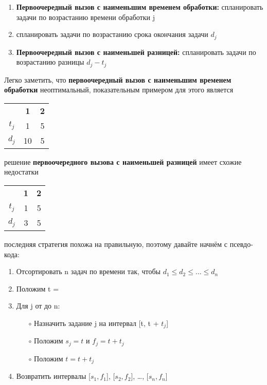\vspace{\baselineskip}
\begin{enumerate}
    \item \textbf{Первоочередный вызов с наименьшим временем обработки:} спланировать задачи по возрастанию времени обработки j
    \item \textbf{\textbf{}} спланировать задачи по возрастанию срока окончания задачи $d_j$
    \item \textbf{Первоочередный вызов с наименьшей разницей:} спланировать задачи по возрастанию разницы $d_j - t_j$
\end{enumerate}

\vspace{\baselineskip}
Легко заметить, что \textbf{первоочередный вызов с наименьшим временем обработки} неоптимальный, показательным примером для этого является

\vspace{\baselineskip}
\begin{tabular}{ccc}
\multicolumn{1}{c}{\textbf{}} &
\multicolumn{1}{c}{\textbf{1}} & \multicolumn{1}{c}{\textbf{2}} \\[5pt]
\ttfamily $t_j$ & 1 & 5\\[5pt]
\ttfamily $d_j$ & 10 & 5 \\[5pt]
\end{tabular}

\vspace{\baselineskip}
решение \textbf{первоочередного вызова с наименьшей разницей} имеет схожие недостатки

\vspace{\baselineskip}
\begin{tabular}{ccc}
\multicolumn{1}{c}{\textbf{}} &
\multicolumn{1}{c}{\textbf{1}} & \multicolumn{1}{c}{\textbf{2}} \\[5pt]
\ttfamily $t_j$ & 1 & 5\\[5pt]
\ttfamily $d_j$ & 3 & 5 \\[5pt]
\end{tabular}

\vspace{\baselineskip}
последняя стратегия похожа на правильную, поэтому давайте начнём с псевдо-кода:

\vspace{\baselineskip}
\begin{enumerate}
    \item Отсортировать n задач по времени так, чтобы $d_1 \le d_2 \le \ldots \le d_n$
    \item Положим t = {\color{Purple}{0}}
    \item Для j от {\color{Purple}{1}} до n:
    \begin{enumerate}
        \item[$\circ$] Назначить задание j на интервал [t, t + $t_j$]
        \item[$\circ$] Положим $s_j = t$ и $f_j = t + t_j$
        \item[$\circ$] Положим $t = t + t_j$
    \end{enumerate}
    \item Возвратить интервалы [$s_1, f_1$], [$s_2, f_2$], \ldots, [$s_n, f_n$]
\end{enumerate}

